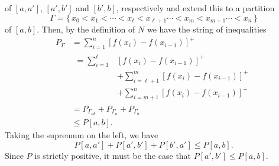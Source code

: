 \begin{solution}
  of $[a,a']$, $[a',b']$ and $[b',b]$, respectively and extend this to a
  partition
  \[
    \Gamma=\{\,x_0<x_1<\cdots<x_\ell<x_{\ell+1}\cdots<x_m<x_{m+1}\cdots<x_n\,\}
  \]
  of $[a,b]$. Then, by the definition of $N$ we have the string of
  inequalities
  \begin{align*}
    P_\Gamma&=\sum_{i=1}^n[f(x_i)-f(x_{i-1})]^+\\
            &\begin{aligned}
              =\sum_{i=1}^\ell&[f(x_i)-f(x_{i-1})]^+\\
              &+\sum_{i=\ell+1}^m[f(x_i)-f(x_{i-1})]^+\\
              &+\sum_{i=m+1}^n[f(x_i)-f(x_{i-1})]^+
            \end{aligned}\\
            &=P_{\Gamma_{ab}}+P_{\Gamma_a}+P_{\Gamma_b}\\
            &\leq P[a,b].
  \end{align*}
  Taking the supremum on the left, we have
  \[
    P[a,a']+P[a',b']+P[b',a']\leq P[a,b].
  \]
  Since $P$ is strictly positive, it must be the case that
  $P[a',b']\leq P[a,b]$.
\end{solution}

